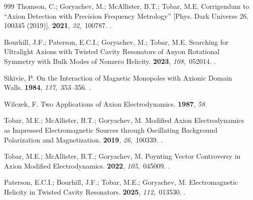 \documentclass[
  aps,
  physrev,
  reprint,
  superscriptaddress,
  nofootinbib,
  amsmath,
  amssymb
]{revtex4-2}
\begin{document}
\begin{thebibliography}{999}
Thomson, C.; Goryachev, M.; McAllister, B.T.; Tobar, M.E.
\newblock Corrigendum to {``Axion Detection with Precision Frequency
  Metrology'' [Phys. Dark Universe 26, 100345 (2019)]}.
 {\bf 2021}, {\em 32},~100787.
.

Bourhill, J.F.; Paterson, E.C.I.; Goryachev, M.; Tobar, M.E.
\newblock Searching for Ultralight Axions with Twisted Cavity Resonators of
  Anyon Rotational Symmetry with Bulk Modes of Nonzero Helicity.
 {\bf 2023}, {\em 108},~052014.
.

Sikivie, P.
\newblock On the Interaction of Magnetic Monopoles with Axionic Domain Walls.
 {\bf 1984}, {\em 137},~353--356.
.

Wilczek, F.
\newblock Two Applications of Axion Electrodynamics.
 {\bf 1987}, {\em 58}.

Tobar, M.E.; McAllister, B.T.; Goryachev, M.
\newblock Modified Axion Electrodynamics as Impressed Electromagnetic Sources
  through Oscillating Background Polarization and Magnetization.
 {\bf 2019}, {\em 26},~100339.
.

Tobar, M.E.; McAllister, B.T.; Goryachev, M.
\newblock Poynting Vector Controversy in Axion Modified Electrodynamics.
 {\bf 2022}, {\em 105},~045009.
.

Paterson, E.C.I.; Bourhill, J.F.; Tobar, M.E.; Goryachev, M.
\newblock Electromagnetic Helicity in Twisted Cavity Resonators.
 {\bf 2025}, {\em 112},~013530.
.


\end{thebibliography}
\end{document}
